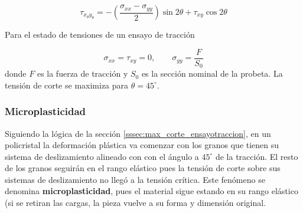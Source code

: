 \begin{equation} \label{eq:plane_stress_transform}
	\tau_{x_\theta y_\theta} = - \left( \frac{\sigma_{xx} - \sigma_{yy}}{2} \right) \sin 2\theta + \tau_{xy} \cos 2 \theta
\end{equation}

Para el estado de tensiones de un ensayo de tracción 

\begin{equation}
	\sigma_{xx} = \tau_{xy} = 0,\qquad \sigma_{yy} = \frac{F}{S_0} 
\end{equation}
donde $F$ es la fuerza de tracción y $S_0$ es la sección nominal de la probeta. La tensión de corte se maximiza para $\theta =  45^\circ$.

\subsubsection{Microplasticidad}

Siguiendo la lógica de la sección \ref{sssec:max_corte_ensayotraccion}, en un policristal la deformación plástica va comenzar con los granos que tienen su sistema de deslizamiento alineado con con el ángulo a $45^\circ$ de la tracción. El resto de los granos seguirán en el rango elástico pues la tensión de corte sobre sus sistemas de deslizamiento no llegó a la tensión crítica. Este fenómeno se denomina \textbf{microplasticidad}, pues el material sigue estando en su rango elástico (si se retiran las cargas, la pieza vuelve a su forma y dimensión original.





